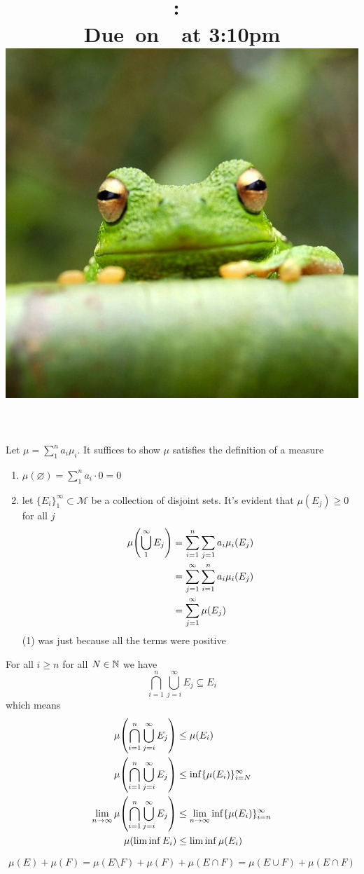 \documentclass{article}
\title{
    \vspace{2in}
    \textmd{\textbf{\hmwkClass:\ \hmwkTitle}}\\
    \normalsize\vspace{0.1in}\small{Due\ on\ \hmwkDueDate\ at 3:10pm}\\
    \includegraphics[scale=0.2]{frog} \\
    \vspace{0.1in}\large{\textit{\hmwkClassTime}}
    \vspace{3in}
}
\author{\hmwkAuthorName}
\date{}
\begin{document}
\maketitle

\pagebreak 

\begin{homeworkProblem}[7]
    Let $\mu=\sum_1^na_i\mu_i$. It suffices to show $\mu$ satisfies the definition of a measure
    \begin{enumerate}
        \item \(
        \mu(\varnothing)=\sum_1^na_i\cdot 0=0
        \)
        \item let $\{E_i\}_1^\infty\subset\mathcal{M}$ be a collection of disjoint sets. It's evident that $\mu(E_j)\geq 0$ for all $j$
        \begin{align}
            \mu\lp\bigcup_1^\infty E_j\rp &= \sum_{i=1}^n\sum_{j=1}a_i\mu_i(E_j) \nonumber \\
            &=\sum_{j=1}^\i\sum_{i=1}^na_i\mu_i(E_j) \\
            &=\sum_{j=1}^\i\mu(E_j) \nonumber
        \end{align}
        (1) was just because all the terms were positive
    \end{enumerate}
\end{homeworkProblem}
\begin{homeworkProblem}
    For all $i\geq n$ for all $N\in \mathbb{N}$ we have
    $$
    \bigcap_{i=1}^n\bigcup_{j=i}^\infty E_j\subseteq E_i
    $$
    which means
    \begin{align*}
        \mu\lp\bigcap_{i=1}^n\bigcup_{j=i}^\infty E_j\rp&\leq \mu(E_i) \\
        \mu\lp\bigcap_{i=1}^n\bigcup_{j=i}^\infty E_j\rp&\leq \inf\{\mu(E_i)\}_{i=N}^\infty \\
        \lim_{n\to\infty}\mu\lp\bigcap_{i=1}^n\bigcup_{j=i}^\infty E_j\rp&\leq\lim_{n\to\infty}\inf\{\mu(E_i)\}_{i=n}^\infty \\
        \mu(\liminf E_i)&\leq \liminf\mu(E_i)
    \end{align*}
\end{homeworkProblem}
\begin{homeworkProblem}
    $$
    \mu(E)+\mu(F)=\mu(E\setminus F)+\mu(F)+\mu(E\cap F)=\mu(E\cup F)+\mu(E\cap F)
    $$
\end{homeworkProblem}
\end{document}
